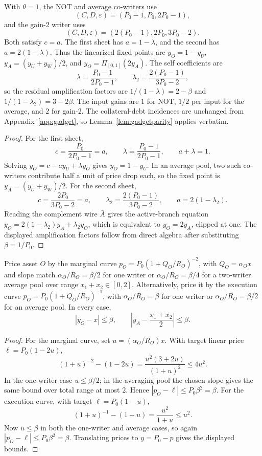 \documentclass{llncs}
\newcommand{\clip}{\Pi}
\newcommand{\eps}{\varepsilon}
\begin{document}
\begin{lemma}
\label{lem:cpsheet}
With \(\theta=1\), the NOT and average co-writers use
\[
        (C,D,\eps)=(P_0-1,P_0,2P_0-1),
\]
and the gain-2 writer uses
\[
        (C,D,\eps)=(2(P_0-1),2P_0,3P_0-2).
\]
Both satisfy \(c=a\). The first sheet has \(a=1-\lambda\), and the second has \(a=2(1-\lambda)\). Thus the linearized fixed points are \(y_O=1-y_U\), \(y_A=(y_U+y_W)/2\), and \(y_O=\clip_{[0,1]}(2y_A)\). The self coefficients are
\[
        \lambda=\frac{P_0-1}{2P_0-1},\qquad
        \lambda_2=\frac{2(P_0-1)}{3P_0-2},
\]
so the residual amplification factors are \(1/(1-\lambda)=2-\beta\) and \(1/(1-\lambda_2)=3-2\beta\). The input gains are \(1\) for NOT, \(1/2\) per input for the average, and \(2\) for gain-2. The collateral-debt incidences are unchanged from Appendix~\ref{app:gadget}, so Lemma~\ref{lem:gadgetparity} applies verbatim.
\end{lemma}
\begin{proof}
For the first sheet,
\[
        c=\frac{P_0}{2P_0-1}=a,\qquad
        \lambda=\frac{P_0-1}{2P_0-1},\qquad
        a+\lambda=1.
\]
Solving \(y_O=c-a y_U+\lambda y_O\) gives \(y_O=1-y_U\). In an average pool, two such co-writers contribute half a unit of price drop each, so the fixed point is \(y_A=(y_U+y_W)/2\). For the second sheet,
\[
        c=\frac{2P_0}{3P_0-2}=a,\qquad
        \lambda_2=\frac{2(P_0-1)}{3P_0-2},\qquad
        a=2(1-\lambda_2).
\]
Reading the complement wire \(\bar A\) gives the active-branch equation \(y_O=2(1-\lambda_2)y_A+\lambda_2 y_O\), which is equivalent to \(y_O=2y_A\), clipped at one. The displayed amplification factors follow from direct algebra after substituting \(\beta=1/P_0\).
\end{proof}

\begin{lemma}
\label{lem:cpcurv}
Price asset \(O\) by the marginal curve \(p_O=P_0(1+Q_O/R_O)^{-2}\), with \(Q_O=\alpha_Ox\) and slope match \(\alpha_O/R_O=\beta/2\) for one writer or \(\alpha_O/R_O=\beta/4\) for a two-writer average pool over range \(x_1+x_2\in[0,2]\). Alternatively, price it by the execution curve \(p_O=P_0(1+Q_O/R_O)^{-1}\), with \(\alpha_O/R_O=\beta\) for one writer or \(\alpha_O/R_O=\beta/2\) for an average pool. In every case,
\[
        |y_O-x|\le\beta,\qquad
        \left|y_A-\frac{x_1+x_2}{2}\right|\le\beta .
\]
\end{lemma}
\begin{proof}
For the marginal curve, set \(u=(\alpha_O/R_O)x\). With target linear price \(\ell=P_0(1-2u)\),
\[
        (1+u)^{-2}-(1-2u)=\frac{u^2(3+2u)}{(1+u)^2}\le 4u^2 .
\]
In the one-writer case \(u\le\beta/2\); in the averaging pool the chosen slope gives the same bound over total range at most \(2\). Hence \(|p_O-\ell|\le P_0\beta^2=\beta\). For the execution curve, with target \(\ell=P_0(1-u)\),
\[
        (1+u)^{-1}-(1-u)=\frac{u^2}{1+u}\le u^2 .
\]
Now \(u\le\beta\) in both the one-writer and average cases, so again \(|p_O-\ell|\le P_0\beta^2=\beta\). Translating prices to \(y=P_0-p\) gives the displayed bounds.
\end{proof}
\end{document}
